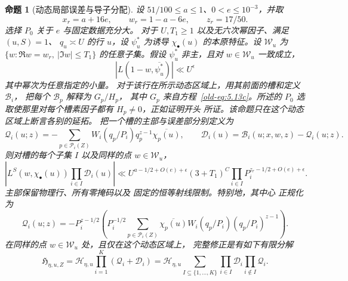 \documentclass[11pt,a4paper]{article}
\numberwithin{equation}{section}
\numberwithin{figure}{section}
\newtheorem{proposition}[theorem]{命题}
\theoremstyle{definition}
\theoremstyle{remark}
\begin{document}
\begin{proposition}[动态局部误差与导子分配]
\label{prop:probe-errors}
设 $51/100\le a\le1$、$0<e\le10^{-3}$，并取
\[
 x_r=a+16e,\qquad w_r=1-a-6e,\qquad z_r=17/50.
\]
选择 $P_0$ 关于 $e$ 与固定数据充分大。
对于 $U,T_1\ge1$ 以及无六次幂因子、满足 $(u,S)=1$、
$q_u\asymp U$ 的行 $u$，设 $\psi_u^*$
为诱导 $\chi_\bullet(u)$ 的本原特征。设
$\mathcal W_u$ 为
$\{w:\Re w=w_r,\ |\Im w|\le T_1\}$ 的任意子集。假设 $\psi_u^*$
非主，且对 $w\in\mathcal W_u$ 一致成立，
\[
 |L(1-w,\overline{\psi_u^*})|\ll U^\epsilon
\]
其中幂次为任意指定的小量。
对于该行在所示动态区域上，用其前面的槽和定义 \(\mathcal B_i\)，
把每个 \(\mathcal B_p\) 解释为 \(G_p/H_p\)，
其中 \(G_p\) 来自方程~\eqref{old-eq:5.13c}。所述的
\(P_0\) 选取使那里对每个槽素因子都有 \(H_p\ne0\)，正如证明开头
所证。该命题只在这个动态区域上断言各别的延拓。
把一个槽的主部与误差部分别定义为
\[
 \mathcal Q_i(u;z)=
       -\sum_{p\in\mathcal P_i(Z)}W_i(q_p/P_i)q_p^{z-1}\overline{\chi_p(u)},
 \qquad
 \mathcal D_i(u)=\mathcal B_i(u;x,w,z)-\mathcal Q_i(u;z).
\]
则对槽的每个子集 $I$ 以及同样的点 $w\in\mathcal W_u$，
\begin{equation}\label{old-eq:5.13e}
 \left|L^S(w,\chi_\bullet(u))\prod_{i\in I}\mathcal D_i(u)\right|
 \ll U^{a-1/2+O(e)+\epsilon}(3+T_1)^C
       \prod_{i\in I}P_i^{z_r-1/2+O(e)+\epsilon}.
\end{equation}
主部保留物理行、所有零掩码以及
固定的恒等射线限制。特别地，其中心
正规化为
\[
 \mathcal Q_i(u;z)=-P_i^{z-1/2}
       \left(P_i^{-1/2}\sum_{p\in\mathcal P_i(Z)}
          \overline{\chi_p(u)}W_i(q_p/P_i)(q_p/P_i)^{z-1}\right).
\]
在同样的点 $w\in\mathcal W_u$ 处，且仅在这个动态区域上，
完整修正是有如下有限分解
\begin{equation}\label{eq:dynamic-compensated-decomposition}
 \mathfrak H_{\eta,u,Z}
 =\mathcal H_{\eta,u}\prod_{i=1}^K(\mathcal Q_i+\mathcal D_i)
 =\mathcal H_{\eta,u}
   \sum_{I\subseteq\{1,\ldots,K\}}
       \prod_{i\in I}\mathcal D_i\prod_{i\notin I}\mathcal Q_i.
\end{equation}
\end{proposition}
\end{document}
